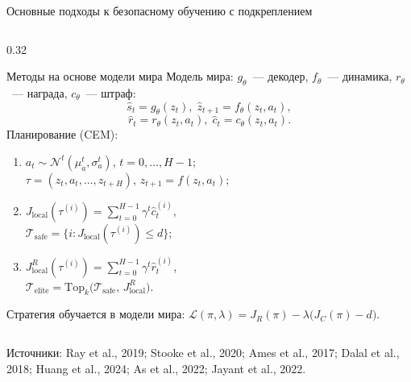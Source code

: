 {\begin{frame}[shrink=12]{Основные подходы к безопасному обучению с подкреплением}
\begin{columns}[T,onlytextwidth]
\begin{column}{0.32\textwidth}
\begin{block}{Методы на основе модели мира}
                Модель мира: \(g_\theta\)~--- декодер,
                \(f_\theta\)~--- динамика, \(r_\theta\)~--- награда,
                \(c_\theta\)~--- штраф:
                \[
                    \hat{s}_t=g_\theta(z_t),\;
                    \hat{z}_{t+1}=f_\theta(z_t,a_t),
                \]
                \[
                    \hat r_t=r_\theta(z_t,a_t),\;
                    \hat c_t=c_\theta(z_t,a_t).
                \]
                Планирование (CEM):
                \begin{enumerate}
                    \setlength{\itemsep}{0pt}
                    \item \(a_t \sim \mathcal{N}^{t}(\mu_a^{t}, \sigma_a^{t})\),
                    \(t = 0, \ldots, H-1\);\\
                    \(\tau=(z_t,a_t,\ldots,z_{t+H})\),
                    \(z_{t+1}=f(z_t,a_t)\);
                    \item \(J_{\mathrm{local}}(\tau^{(i)})
                    =\sum_{t=0}^{H-1}\gamma^t\hat c_t^{(i)}\),\\
                    \(\mathcal{T}_{\mathrm{safe}}
                    =\bigl\{i:J_{\mathrm{local}}(\tau^{(i)})\leq d\bigr\}\);
                    \item \(J_{\mathrm{local}}^R(\tau^{(i)})
                    =\sum_{t=0}^{H-1}\gamma^t\hat r_t^{(i)}\),\\
                    \(\mathcal{T}_{\mathrm{elite}}
                    =\mathrm{Top}_k\bigl(\mathcal{T}_{\mathrm{safe}},\,J_{\mathrm{local}}^R\bigr)\).
                \end{enumerate}
                Стратегия обучается в модели мира:
                \(\mathcal{L}(\pi,\lambda)=J_R(\pi)-\lambda\bigl(J_C(\pi)-d\bigr)\).
            \end{block}
        \end{column}
    \end{columns}

    \vfill
    {\tiny Источники: Ray et al., 2019; Stooke et al., 2020; Ames et al., 2017;
    Dalal et al., 2018; Huang et al., 2024; As et al., 2022; Jayant et al., 2022.\par}
\end{frame}
}

